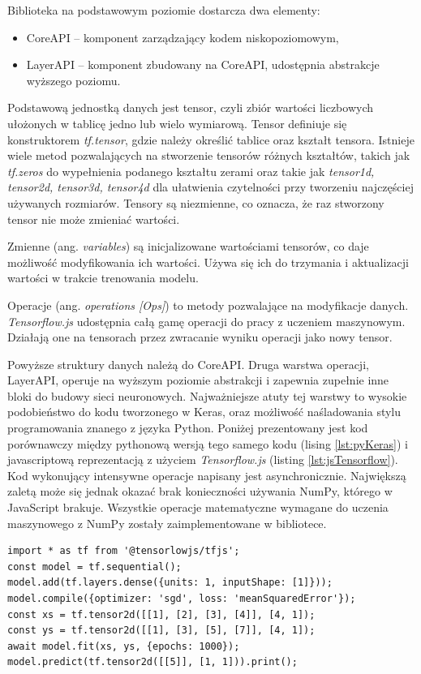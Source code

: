 \documentclass[12pt,a4paper,twoside,titlepage,openright]{book}
\begin{document}
Biblioteka na podstawowym poziomie dostarcza dwa elementy:
\begin{itemize}
\item CoreAPI -- komponent zarządzający kodem niskopoziomowym,
\item LayerAPI -- komponent zbudowany na CoreAPI, udostępnia abstrakcje wyższego poziomu.
\end{itemize}

Podstawową jednostką danych jest tensor, czyli zbiór wartości liczbowych ułożonych w tablicę jedno lub wielo wymiarową. Tensor definiuje się konstruktorem \textit{tf.tensor}, gdzie należy określić tablice oraz kształt tensora. Istnieje wiele metod pozwalających na stworzenie tensorów różnych kształtów, takich jak \textit{tf.zeros} do wypełnienia podanego kształtu zerami oraz takie jak \textit{tensor1d, tensor2d, tensor3d, tensor4d} dla ułatwienia czytelności przy tworzeniu najczęściej używanych rozmiarów.
Tensory są niezmienne, co oznacza, że raz stworzony tensor nie może zmieniać wartości. 

Zmienne (ang. \textit{variables}) są inicjalizowane wartościami tensorów, co daje możliwość modyfikowania ich wartości. Używa się ich do trzymania i aktualizacji wartości w trakcie trenowania modelu.

Operacje (ang. \textit{operations [Ops]}) to metody pozwalające na modyfikacje danych. \textit{Tensorflow.js} udostępnia całą gamę operacji do pracy z uczeniem maszynowym. Działają one na tensorach przez zwracanie wyniku operacji jako nowy tensor.

Powyższe struktury danych należą do CoreAPI. Druga warstwa operacji, LayerAPI, operuje na wyższym poziomie abstrakcji i zapewnia zupełnie inne bloki do budowy sieci neuronowych. Najważniejsze atuty tej warstwy to wysokie podobieństwo do kodu tworzonego w Keras, oraz możliwość naśladowania stylu programowania znanego z języka Python. Poniżej prezentowany jest kod porównawczy między pythonową wersją tego samego kodu (lising \ref{lst:pyKeras}) i javascriptową reprezentacją z użyciem \textit{Tensorflow.js} (listing \ref{lst:jsTensorflow}). Kod wykonujący intensywne operacje napisany jest asynchronicznie. Największą zaletą może się jednak okazać brak konieczności używania NumPy, którego w JavaScript brakuje. Wszystkie operacje matematyczne wymagane do uczenia maszynowego z NumPy zostały zaimplementowane w bibliotece. \cite{siteTensorflowJSConcepts}

\noindent
\begin{minipage}{\linewidth}
\begin{lstlisting}[caption=Proste operacje w JavaScript z Tensorflow.js, label=lst:jsTensorflow]
import * as tf from '@tensorlowjs/tfjs';
const model = tf.sequential();
model.add(tf.layers.dense({units: 1, inputShape: [1]}));
model.compile({optimizer: 'sgd', loss: 'meanSquaredError'});
const xs = tf.tensor2d([[1], [2], [3], [4]], [4, 1]);
const ys = tf.tensor2d([[1], [3], [5], [7]], [4, 1]);
await model.fit(xs, ys, {epochs: 1000});
model.predict(tf.tensor2d([[5]], [1, 1])).print();
\end{lstlisting}
\end{minipage}
\end{document}
